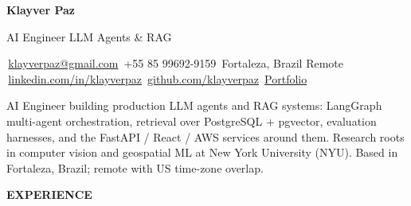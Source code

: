 \documentclass[10pt,a4paper]{article}
\renewcommand{\section}[1]{%
  \par\vspace{10pt}%
  {\large\bfseries\color{accent}\MakeUppercase{#1}}\par%
  \vspace{2pt}%
  \noindent{\color{rule}\rule{\linewidth}{0.6pt}}\par%
  \vspace{2pt}%
}
\begin{document}
\begin{center}
  {\Huge\bfseries Klayver Paz}\par
  \vspace{2pt}
  {\large\color{muted} AI Engineer \textperiodcentered{} LLM Agents \& RAG}\par
  \vspace{6pt}
  {\small
    \faEnvelope\,\href{mailto:klayverpaz@gmail.com}{klayverpaz@gmail.com}
    \quad\faPhone\,+55 85 99692-9159
    \quad\faMapMarker\,Fortaleza, Brazil \textperiodcentered{} Remote \\[2pt]
    \faLinkedin\,\href{https://www.linkedin.com/in/klayverpaz/}{linkedin.com/in/klayverpaz}
    \quad\faGithub\,\href{https://github.com/klayverpaz}{github.com/klayverpaz}
    \quad\faGlobe\,\href{https://klayverpaz.github.io/}{Portfolio}
  }
\end{center}

\vspace{2pt}
\noindent
AI Engineer building production LLM agents and RAG systems: LangGraph multi-agent orchestration, retrieval over PostgreSQL + pgvector, evaluation harnesses, and the FastAPI / React / AWS services around them. Research roots in computer vision and geospatial ML at New York University (NYU). Based in Fortaleza, Brazil; remote with US time-zone overlap.

\section{Experience}
\end{document}
